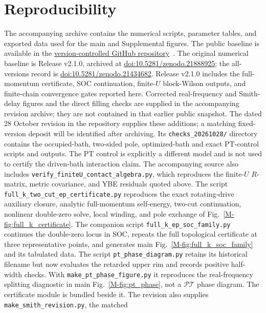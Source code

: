 \documentclass[%
  aps,physrev,onecolumn,10pt,amsmath,amssymb,superscriptaddress,longbibliography,floatfix
]{revtex4-2}
\newcommand{\PT}{\mathcal{PT}}
\begin{document}
\section*{Reproducibility}
The accompanying archive contains the numerical scripts, parameter tables,
and exported data used for the main and Supplemental figures.  The public
baseline is available in the
\href{https://github.com/VMKPHYSMATH/emergent-pt-dirac-impurity}{version-controlled GitHub repository}~\cite{kulkarni2026code}.
The original numerical baseline is Release v2.1.0, archived at
\href{https://doi.org/10.5281/zenodo.21888925}{doi:10.5281/zenodo.21888925};
the all-versions record is
\href{https://doi.org/10.5281/zenodo.21434682}{doi:10.5281/zenodo.21434682}.
Release v2.1.0 includes the full-momentum certificate, SOC continuation,
finite-$U$ block-Wilson outputs, and finite-chain convergence gates reported
here.  Corrected real-frequency and Smith-delay figures and the direct
filling checks are supplied in the accompanying revision archive;
they are not contained in that earlier public snapshot. The dated 28 October revision in the
repository supplies these additions; a matching fixed-version deposit
will be identified after archiving. Its \nolinkurl{checks_20261028/}
directory contains the occupied-bath, two-sided pole, optimized-bath and
exact PT-control scripts and outputs. The PT control is explicitly a
different model and is not used to certify the driven-bath interaction
claim.
The accompanying source also includes
\nolinkurl{verify_finiteU_contact_algebra.py}, which reproduces the
finite-\(U\) \(R\)-matrix, metric covariance, and YBE residuals quoted above.
The script \nolinkurl{full_k_two_cut_ep_certificate.py} reproduces the exact
rotating-drive auxiliary closure, analytic full-momentum self-energy,
two-cut continuation, nonlinear double-zero solve, local winding, and pole
exchange of Fig.~\ref{M-fig:full_k_certificate}.
The companion script \nolinkurl{full_k_ep_soc_family.py} continues the
double-zero locus in SOC, repeats the full topological certificate at three
representative points, and generates main Fig.~\ref{M-fig:full_k_soc_family}
and its tabulated data.
The script \nolinkurl{pt_phase_diagram.py} retains its historical filename
but now evaluates the retarded upper rim and records positive half-width
checks.  With \nolinkurl{make_pt_phase_figure.py} it reproduces the
real-frequency splitting diagnostic in main Fig.~\ref{M-fig:pt_phase},
not a $\PT$ phase diagram.  The certificate module is bundled beside it.
The revision also supplies \nolinkurl{make_smith_revision.py}, the matched
\end{document}
